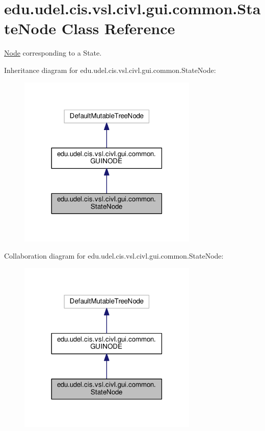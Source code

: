 \hypertarget{classedu_1_1udel_1_1cis_1_1vsl_1_1civl_1_1gui_1_1common_1_1StateNode}{}\section{edu.\+udel.\+cis.\+vsl.\+civl.\+gui.\+common.\+State\+Node Class Reference}
\label{classedu_1_1udel_1_1cis_1_1vsl_1_1civl_1_1gui_1_1common_1_1StateNode}


\hyperlink{structNode}{Node} corresponding to a State.  




Inheritance diagram for edu.\+udel.\+cis.\+vsl.\+civl.\+gui.\+common.\+State\+Node\+:
\nopagebreak
\begin{figure}[H]
\begin{center}
\leavevmode
\includegraphics[width=242pt]{classedu_1_1udel_1_1cis_1_1vsl_1_1civl_1_1gui_1_1common_1_1StateNode__inherit__graph}
\end{center}
\end{figure}


Collaboration diagram for edu.\+udel.\+cis.\+vsl.\+civl.\+gui.\+common.\+State\+Node\+:
\nopagebreak
\begin{figure}[H]
\begin{center}
\leavevmode
\includegraphics[width=242pt]{classedu_1_1udel_1_1cis_1_1vsl_1_1civl_1_1gui_1_1common_1_1StateNode__coll__graph}
\end{center}
\end{figure}
